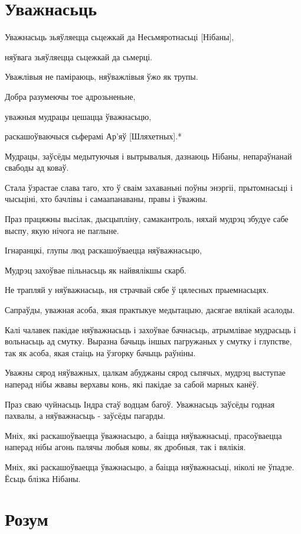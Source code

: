 \documentclass{article}
\begin{document}
\section{Уважнасьць}

Уважнасьць зьяўляецца сьцежкай да Несьмяротнасьці {[}Нібаны{]},

няўвага зьяўляецца сьцежкай да сьмерці.

Уважлівыя не паміраюць, няўважлівыя ўжо як трупы.

Добра разумеючы тое адрозьненьне,

уважныя мудрацы цешацца ўважнасьцю,

раскашоўваючыся сьферамі Ар'яў {[}Шляхетных{]}.*

Мудрацы, заўсёды медытуючыя і вытрывалыя, дазнаюць Нібаны,
непараўнанай свабоды ад коваў.

Стала ўзрастае слава таго, хто ў сваім захаваньні поўны энэргіі,
прытомнасьці і чысьціні, хто бачлівы і самаапанаваны, правы і ўважны.

Праз працяжны высілак, дысцыпліну, самакантроль, няхай мудрэц збудуе
сабе выспу, якую нічога не паглыне.

Ігнаранцкі, глупы люд раскашоўваецца няўважнасьцю,

Мудрэц захоўвае пільнасьць як найвялікшы скарб.

Не трапляй у няўважнасьць, ня страчвай сябе ў цялесных прыемнасьцях.

Сапраўды, уважная асоба, якая практыкуе медытацыю, дасягае вялікай
асалоды.

Калі чалавек пакідае няўважнасьць і захоўвае бачнасьць, атрымлівае
мудрасьць і вольнасьць ад смутку. Выразна бачыць іншых пагружаных у
смутку і глупстве, так як асоба, якая стаіць на ўзгорку бачыць раўніны.

Уважны сярод няўважных, цалкам абуджаны сярод сьпячых, мудрэц
выступае наперад нібы жвавы верхавы конь, які пакідае за сабой марных
канёў.

Праз сваю чуйнасьць Індра стаў водцам багоў. Уважнасьць заўсёды
годная пахвалы, а няўважнасьць - заўсёды пагарды.

Мніх, які раскашоўваецца ўважнасьцю, а баіцца няўважнасьці,
прасоўваецца наперад нібы агонь палячы любыя ковы, як дробныя, так і
вялікія.

Мніх, які раскашоўваецца ўважнасьцю, а баіцца няўважнасьці, ніколі
не ўпадзе. Ёсьць блізка Нібаны.

\section{Розум}
\end{document}

